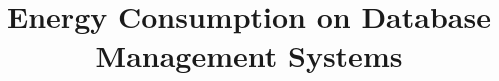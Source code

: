 \documentclass[
  docdegree=msc,        %
  school=um/eeng,      %
  lang=en,              %
  fontstyle=newsgott,     %
  chapstyle=elegant,    %
  otherlistsat=front,   %
  secondcover=true,     %
  aftercover=false,     %
  linkscolor=darkblue,  %
  printcommittee=false,  %
  spine=false,          %
  cdcover=false,         %
  biblatex={            %
    backend=bibtex,     %
    style=numeric-comp, %
    sortcites=true,     %
    sorting=nyt,        %
    maxbibnames=99,     %
    giveninits=true,    %
    hyperref=true       %
  },
  memoir={              %
    a4paper,            %
    12pt,               %
    final,              %
    oneside
  },
  media=screen,         %
  oneside
]{novathesis}
\title[Energy Consumption on Database Management Systems]{Energy Consumption on Database Management Systems}
\begin{document}
\printcoverpage   %
\thesisfrontmatter  %
\printaftercover
\printcopyright    %
\printstatementofintegrity
\printdedicatory  %
\printacknowledgements  %
\printquote        %
\printabstract    %
\printtoc         %
\printotherlists   %


\thesismainmatter  %
\printchapthers    %
\printbib    %
\printappendixes  %
\printannexes  %
\printbackcoverpage
\end{document}
